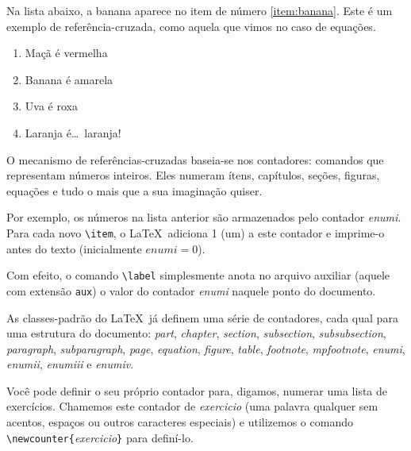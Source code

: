 \documentclass[a4paper,12pt]{article}
\newcommand{\contador}[1]{\textit{#1}}
\begin{document}
	Na lista abaixo, a banana aparece no item de número \ref{item:banana}. Este é
	um exemplo de referência-cruzada, como aquela que vimos no caso de equações.

	\begin{enumerate}
		\item Maçã é vermelha
		\item \label{item:banana} Banana é amarela %
		\item Uva é roxa
		
		\item Laranja é\dots\ laranja!
	\end{enumerate}

	O mecanismo de referências-cruzadas baseia-se nos contadores: comandos que
	representam números inteiros. Eles numeram ítens, capítulos, seções, figuras,
	equações e tudo o mais que a sua imaginação quiser.

	Por exemplo, os números na lista anterior são armazenados pelo contador
	\contador{enumi}. Para cada novo \verb|\item|, o \LaTeX\ adiciona 1 (um) a
	este contador e imprime-o antes do texto (inicialmente \(\contador{enumi} =
	0\)).
	
	Com efeito, o comando \verb|\label| simplesmente anota no arquivo auxiliar
	(aquele com extensão \texttt{aux}) o valor do contador \contador{enumi} 
	naquele ponto do documento.
	
	As classes-padrão do \LaTeX\ já definem uma série de contadores, cada qual
	para uma estrutura do documento:
		\contador{part},
		\contador{chapter},
		\contador{section},
		\contador{subsection},
		\contador{subsubsection},
		\contador{paragraph},
		\contador{subparagraph},
		\contador{page},
		\contador{equation},
		\contador{figure},
		\contador{table},
		\contador{footnote},
		\contador{mpfootnote},
		\contador{enumi},
		\contador{enumii},
		\contador{enumiii} e
		\contador{enumiv}.
				
	Você pode definir o seu próprio contador para, digamos, numerar uma lista 
	de exercícios. Chamemos este contador de \contador{exercicio} (uma palavra
	qualquer sem acentos, espaços ou outros caracteres especiais) e utilizemos
	o comando \verb|\newcounter{|\contador{exercicio}\verb|}| para definí-lo.
	
	
\end{document}
